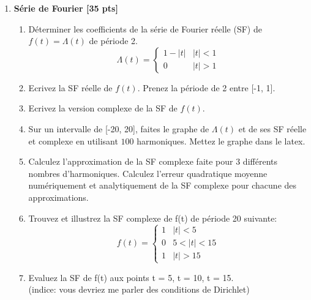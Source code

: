\documentclass{article}
\begin{document}
\begin{enumerate}
\item {\bf Série de Fourier [35 pts]}
  \begin{enumerate}
    \vspace{0.5cm}
  \item Déterminer les coefficients de la série de Fourier réelle (SF)
    de $f(t) = \Lambda(t)$ de période 2. %
    $$
    \Lambda(t) = \left \{
      \begin{array}{cl}
        1 - |t| &   |t| < 1 \\
        0 & |t| > 1
      \end{array} \right .
    $$  
    \vspace{1cm}
  \item Ecrivez la SF réelle de $f(t)$. Prenez la période de 2 entre
    [-1, 1]. 
    \vspace{1cm}    
  \item Ecrivez la version complexe de
    la SF de $f(t)$. 
    \vspace{1cm}    
  \item Sur un intervalle de [-20, 20], faites le graphe
    de $\Lambda(t)$ et de ses SF réelle et complexe en utilisant $100$
    harmoniques. Mettez le graphe dans le latex. 
    \vspace{1cm}    
  \item Calculez l'approximation de la SF complexe
    faite pour 3 différents nombres d'harmoniques. Calculez
    l'erreur quadratique moyenne numériquement et analytiquement de la
    SF complexe pour chacune des approximations. 
    \vspace{1cm}
  \item Trouvez et illustrez la SF complexe de f(t) de période 20 suivante:  
      $$
      f(t) = \left \{
        \begin{array}{cl}
          1   & |t| < 5 \\
          0   & 5 < |t| < 15 \\
          1   & |t| > 15
        \end{array} \right .
      $$  
      \vspace{1cm}
    \item Evaluez la SF de f(t) aux points t = 5, t = 10, t =
      15. \\
      (indice: vous devriez me parler des conditions de Dirichlet)
      
    \end{enumerate}
\vspace{1cm}

\newpage


\end{enumerate}
\end{document}
